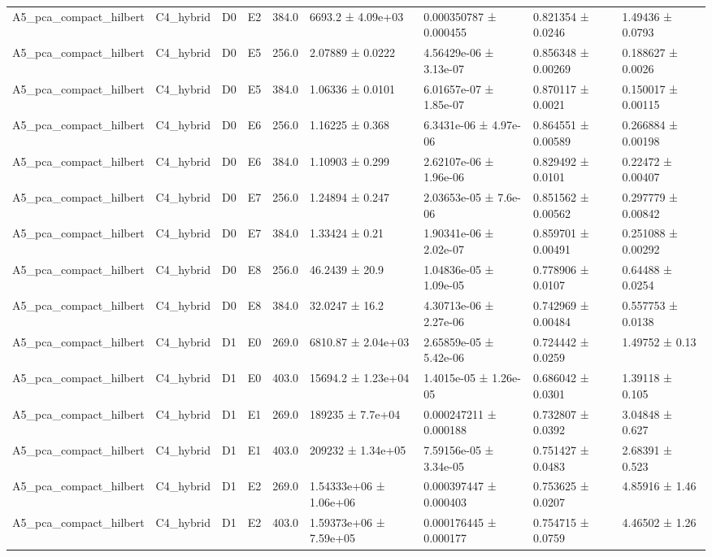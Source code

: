 \begin{table}
\begin{tabular}{lllllllll}
A5\_pca\_compact\_hilbert & C4\_hybrid & D0 & E2 & 384.0 & 6693.2 ± 4.09e+03 & 0.000350787 ± 0.000455 & 0.821354 ± 0.0246 & 1.49436 ± 0.0793 \\
A5\_pca\_compact\_hilbert & C4\_hybrid & D0 & E5 & 256.0 & 2.07889 ± 0.0222 & 4.56429e-06 ± 3.13e-07 & 0.856348 ± 0.00269 & 0.188627 ± 0.0026 \\
A5\_pca\_compact\_hilbert & C4\_hybrid & D0 & E5 & 384.0 & 1.06336 ± 0.0101 & 6.01657e-07 ± 1.85e-07 & 0.870117 ± 0.0021 & 0.150017 ± 0.00115 \\
A5\_pca\_compact\_hilbert & C4\_hybrid & D0 & E6 & 256.0 & 1.16225 ± 0.368 & 6.3431e-06 ± 4.97e-06 & 0.864551 ± 0.00589 & 0.266884 ± 0.00198 \\
A5\_pca\_compact\_hilbert & C4\_hybrid & D0 & E6 & 384.0 & 1.10903 ± 0.299 & 2.62107e-06 ± 1.96e-06 & 0.829492 ± 0.0101 & 0.22472 ± 0.00407 \\
A5\_pca\_compact\_hilbert & C4\_hybrid & D0 & E7 & 256.0 & 1.24894 ± 0.247 & 2.03653e-05 ± 7.6e-06 & 0.851562 ± 0.00562 & 0.297779 ± 0.00842 \\
A5\_pca\_compact\_hilbert & C4\_hybrid & D0 & E7 & 384.0 & 1.33424 ± 0.21 & 1.90341e-06 ± 2.02e-07 & 0.859701 ± 0.00491 & 0.251088 ± 0.00292 \\
A5\_pca\_compact\_hilbert & C4\_hybrid & D0 & E8 & 256.0 & 46.2439 ± 20.9 & 1.04836e-05 ± 1.09e-05 & 0.778906 ± 0.0107 & 0.64488 ± 0.0254 \\
A5\_pca\_compact\_hilbert & C4\_hybrid & D0 & E8 & 384.0 & 32.0247 ± 16.2 & 4.30713e-06 ± 2.27e-06 & 0.742969 ± 0.00484 & 0.557753 ± 0.0138 \\
A5\_pca\_compact\_hilbert & C4\_hybrid & D1 & E0 & 269.0 & 6810.87 ± 2.04e+03 & 2.65859e-05 ± 5.42e-06 & 0.724442 ± 0.0259 & 1.49752 ± 0.13 \\
A5\_pca\_compact\_hilbert & C4\_hybrid & D1 & E0 & 403.0 & 15694.2 ± 1.23e+04 & 1.4015e-05 ± 1.26e-05 & 0.686042 ± 0.0301 & 1.39118 ± 0.105 \\
A5\_pca\_compact\_hilbert & C4\_hybrid & D1 & E1 & 269.0 & 189235 ± 7.7e+04 & 0.000247211 ± 0.000188 & 0.732807 ± 0.0392 & 3.04848 ± 0.627 \\
A5\_pca\_compact\_hilbert & C4\_hybrid & D1 & E1 & 403.0 & 209232 ± 1.34e+05 & 7.59156e-05 ± 3.34e-05 & 0.751427 ± 0.0483 & 2.68391 ± 0.523 \\
A5\_pca\_compact\_hilbert & C4\_hybrid & D1 & E2 & 269.0 & 1.54333e+06 ± 1.06e+06 & 0.000397447 ± 0.000403 & 0.753625 ± 0.0207 & 4.85916 ± 1.46 \\
A5\_pca\_compact\_hilbert & C4\_hybrid & D1 & E2 & 403.0 & 1.59373e+06 ± 7.59e+05 & 0.000176445 ± 0.000177 & 0.754715 ± 0.0759 & 4.46502 ± 1.26 \\

\end{tabular}
\end{table}
